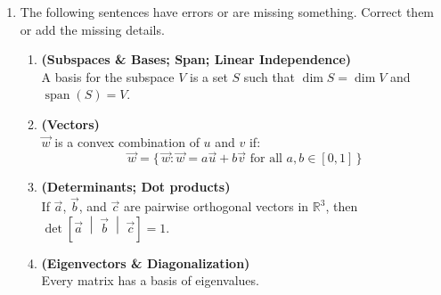 \documentclass[red]{tutorial}
\newcommand{\R}{\mathbb{R}}
\newcommand{\mute}[1]{}
\DeclareMathOperator{\Span} {span}
\theoremstyle{definition}
\theoremstyle{theorem}
\begin{document}
\begin{tutorial}
  \begin{enumerate}
    \item The following sentences have errors or are missing 
      something. Correct them or add the missing details.
      \begin{enumerate}
          \mute{
        \item \textbf{(Linear Transformations)}\\
          A transformation $f\colon\R^n\to \R^m$ is linear if 
          it sends sums to sums, $f(\vec0) = \vec0$, and 
          $f(\alpha \vec x) = \alpha f(\vec x)$.
        \item 
          An $n\times m$ matrix corresponds to a linear 
          transformation from $\R^n$
          to $\R^m$.}
        \item \textbf{(Subspaces \& Bases; Span; Linear Independence)}\\
          A basis for the subspace $V$ is a set $S$ 
          such that $\dim S = \dim V$ and $\Span(S) = V$.
        \item \textbf{(Vectors)}\\
          $\vec w$ is a convex combination of $u$ and $v$ if:
          \begin{equation*}
            \vec w =
            \bigl\{\,\vec w:\vec w = a\vec u %
              +b\vec v \text{ for all } a,b\in [0,1]\,
            \bigr\}
          \end{equation*}
        \item \textbf{(Determinants; Dot products)} \\
          If $\vec a$, $\vec b$, and $\vec c$ are pairwise orthogonal 
          vectors in $\R^3$, then 
          $\det \left[\vec a\;\middle|\;\vec b\;\middle|\;\vec c\right] = 1$.
        \item \textbf{(Eigenvectors \& Diagonalization)}\\
          Every matrix has a basis of eigenvalues.
      \end{enumerate}
      \mute{
    \item %
}
\end{enumerate}
\end{tutorial}
\end{document}
